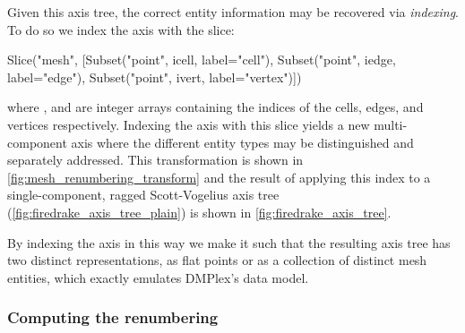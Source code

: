 \documentclass[thesis]{subfiles}
\begin{document}
Given this axis tree, the correct entity information may be recovered via \emph{indexing}.
To do so we index the  axis with the slice:
\begin{pyinline}
  Slice("mesh", [Subset("point", icell, label="cell"),
                 Subset("point", iedge, label="edge"),
                 Subset("point", ivert, label="vertex")])
\end{pyinline}
where ,  and  are integer arrays containing the indices of the cells, edges, and vertices respectively.
Indexing the  axis with this slice yields a new multi-component axis where the different entity types may be distinguished and separately addressed.
This transformation is shown in \cref{fig:mesh_renumbering_transform} and the result of applying this index to a single-component, ragged Scott-Vogelius axis tree (\cref{fig:firedrake_axis_tree_plain}) is shown in \cref{fig:firedrake_axis_tree}.

By indexing the  axis in this way we make it such that the resulting axis tree has two distinct representations, as flat points or as a collection of distinct mesh entities, which exactly emulates DMPlex's data model.

\subsubsection{Computing the renumbering}
\end{document}
